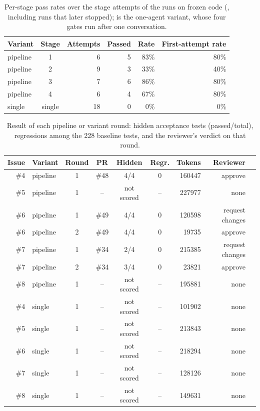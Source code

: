 \begin{table}[ht]\centering\small
\caption{Per-stage pass rates over the stage attempts of the runs on frozen code (, including runs that later stopped);  is the one-agent variant, whose four gates run after one conversation.}\label{tab:rates}
\begin{tabular}{@{}l c r r r r@{}}
\toprule
Variant & Stage & Attempts & Passed & Rate & First-attempt rate \\ \midrule
pipeline & 1 & 6 & 5 & 83\% & 80\% \\
pipeline & 2 & 9 & 3 & 33\% & 40\% \\
pipeline & 3 & 7 & 6 & 86\% & 80\% \\
pipeline & 4 & 6 & 4 & 67\% & 80\% \\
single & single & 18 & 0 & 0\% & 0\% \\
\bottomrule\end{tabular}
\end{table}
\begin{table}[ht]\centering\small
\caption{Result of each pipeline or variant round: hidden acceptance tests (passed/total), regressions among the 228 baseline tests, and the reviewer's verdict on that round.}\label{tab:issues}
\begin{tabular}{@{}r l c c c c r r l@{}}
\toprule
Issue & Variant & Round & PR & Hidden & Regr. & Tokens & Reviewer & \\ \midrule
\#4 & pipeline & 1 & \#48 & 4/4 & 0 & 160447 & approve & \\
\#5 & pipeline & 1 & -- & not scored & -- & 227977 & none & \\
\#6 & pipeline & 1 & \#49 & 4/4 & 0 & 120598 & request changes & \\
\#6 & pipeline & 2 & \#49 & 4/4 & 0 & 19735 & approve & \\
\#7 & pipeline & 1 & \#34 & 2/4 & 0 & 215385 & request changes & \\
\#7 & pipeline & 2 & \#34 & 3/4 & 0 & 23821 & approve & \\
\#8 & pipeline & 1 & -- & not scored & -- & 195881 & none & \\
\#4 & single & 1 & -- & not scored & -- & 101902 & none & \\
\#5 & single & 1 & -- & not scored & -- & 213843 & none & \\
\#6 & single & 1 & -- & not scored & -- & 218294 & none & \\
\#7 & single & 1 & -- & not scored & -- & 128126 & none & \\
\#8 & single & 1 & -- & not scored & -- & 149631 & none & \\
\bottomrule\end{tabular}
\end{table}
